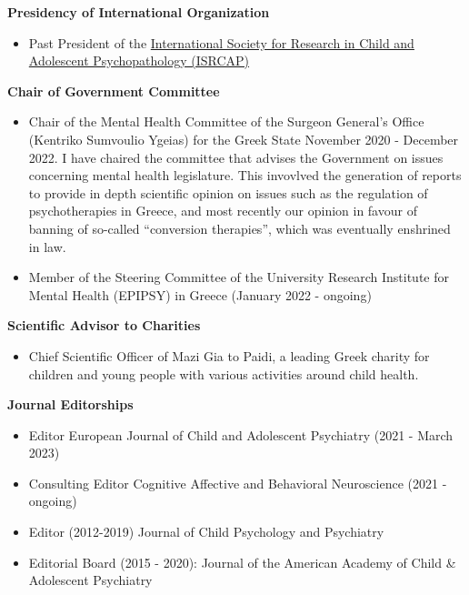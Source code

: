 \documentclass[
]{article}
\providecommand{\tightlist}{%
  \setlength{\itemsep}{0pt}\setlength{\parskip}{0pt}}
\begin{document}
\textbf{Presidency of International Organization}

\begin{itemize}
\tightlist
\item
  Past President of the
  \href{https://isrcap.org/executive-committee.html}{International
  Society for Research in Child and Adolescent Psychopathology (ISRCAP)}
\end{itemize}

\textbf{Chair of Government Committee}

\begin{itemize}
\item
  Chair of the Mental Health Committee of the Surgeon General's Office
  (Kentriko Sumvoulio Ygeias) for the Greek State November 2020 -
  December 2022. I have chaired the committee that advises the
  Government on issues concerning mental health legislature. This
  invovlved the generation of reports to provide in depth scientific
  opinion on issues such as the regulation of psychotherapies in Greece,
  and most recently our opinion in favour of banning of so-called
  ``conversion therapies'', which was eventually enshrined in law.
\item
  Member of the Steering Committee of the University Research Institute
  for Mental Health (EPIPSY) in Greece (January 2022 - ongoing)
\end{itemize}

\textbf{Scientific Advisor to Charities}

\begin{itemize}
\tightlist
\item
  Chief Scientific Officer of Mazi Gia to Paidi, a leading Greek charity
  for children and young people with various activities around child
  health.
\end{itemize}

\textbf{Journal Editorships}

\begin{itemize}
\tightlist
\item
  Editor European Journal of Child and Adolescent Psychiatry (2021 -
  March 2023)
\item
  Consulting Editor Cognitive Affective and Behavioral Neuroscience
  (2021 - ongoing)
\item
  Editor (2012-2019) Journal of Child Psychology and Psychiatry
\item
  Editorial Board (2015 - 2020): Journal of the American Academy of
  Child \& Adolescent Psychiatry
\end{itemize}
\end{document}
